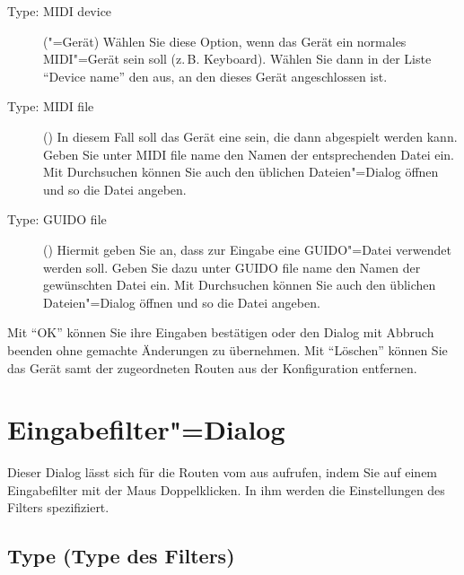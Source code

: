 \begin{description}
\item[Type: MIDI device] ("=Gerät)
  Wählen Sie diese Option, wenn das Gerät ein normales MIDI"=Gerät
  sein soll (z.\,B. Keyboard). Wählen Sie dann in der Liste "`Device
  name"' den  aus, an den dieses
  Gerät angeschlossen ist.

\item[Type: MIDI file] ()
  In diesem Fall soll das Gerät eine
   sein, die dann abgespielt
  werden kann. Geben Sie unter MIDI file name den Namen der
  entsprechenden Datei ein. Mit Durchsuchen können Sie auch den
  üblichen Dateien"=Dialog öffnen und so die Datei angeben.

\item[Type: GUIDO file] () Hiermit
  geben Sie an, dass zur Eingabe eine GUIDO"=Datei verwendet werden
  soll. Geben Sie dazu unter GUIDO file name den Namen der gewünschten
  Datei ein. Mit Durchsuchen können Sie auch den üblichen
  Dateien"=Dialog öffnen und so die Datei angeben.
\end{description}


Mit "`OK"' können Sie ihre Eingaben bestätigen oder den Dialog mit Abbruch
beenden ohne gemachte Änderungen zu übernehmen.  Mit "`Löschen"'
können Sie das Gerät samt der zugeordneten Routen aus der
Konfiguration entfernen.

\section{Eingabefilter"=Dialog}\label{sec:DE_R1}
Dieser Dialog lässt sich für die Routen vom
 aus aufrufen, indem Sie auf
einem Eingabefilter mit der Maus Doppelklicken. In ihm werden die
Einstellungen des Filters spezifiziert.

\subsection{Type (Type des Filters)}

